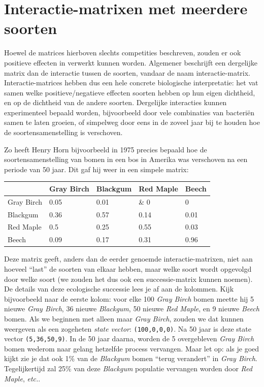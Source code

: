 \documentclass[
  a4paper,
]{scrbook}
\theoremstyle{definition}
\theoremstyle{remark}
\begin{document}
\hypertarget{interactie-matrixen-met-meerdere-soorten}{%
\section{Interactie-matrixen met meerdere
soorten}\label{interactie-matrixen-met-meerdere-soorten}}

Hoewel de matrices hierboven slechts competities beschreven, zouden er
ook positieve effecten in verwerkt kunnen worden. Algemener beschrijft
een dergelijke matrix dan de interactie tussen de soorten, vandaar de
naam interactie-matrix. Interactie-matrices hebben dus een hele concrete
biologische interpretatie: het vat samen welke positieve/negatieve
effecten soorten hebben op hun eigen dichtheid, en op de dichtheid van
de andere soorten. Dergelijke interacties kunnen experimenteel bepaald
worden, bijvoorbeeld door vele combinaties van bacteriën samen te laten
groeien, of simpelweg door eens in de zoveel jaar bij te houden hoe de
soortensamenstelling is verschoven.

Zo heeft Henry Horn bijvoorbeeld in 1975 precies bepaald hoe de
soortensamenstelling van bomen in een bos in Amerika was verschoven na
een periode van 50 jaar. Dit gaf hij weer in een simpele matrix:

\begin{longtable}[]{@{}lllll@{}}
\toprule\noalign{}
& Gray Birch & Blackgum & Red Maple & Beech \\
\midrule\noalign{}
\endhead
\bottomrule\noalign{}
\endlastfoot
Gray Birch & 0.05 & 0.01 & \& 0 & 0 \\
Blackgum & 0.36 & 0.57 & 0.14 & 0.01 \\
Red Maple & 0.5 & 0.25 & 0.55 & 0.03 \\
Beech & 0.09 & 0.17 & 0.31 & 0.96 \\
\end{longtable}

Deze matrix geeft, anders dan de eerder genoemde interactie-matrixen,
niet aan hoeveel ``last'' de soorten van elkaar hebben, maar welke soort
wordt opgevolgd door welke soort (we zouden het dus ook een
successie-matrix kunnen noemen). De details van deze ecologische
successie lees je af aan de kolommen. Kijk bijvoorbeeld naar de eerste
kolom: voor elke 100 \emph{Gray Birch} bomen meette hij 5 nieuwe
\emph{Gray Birch}, 36 nieuwe \emph{Blackgum}, 50 nieuwe \emph{Red
Maple}, en 9 nieuwe \emph{Beech} bomen. Als we beginnen met alleen maar
\emph{Gray Birch}, zouden we dat kunnen weergeven als een zogeheten
\emph{state vector}: \texttt{(100,0,0,0)}. Na 50 jaar is deze state
vector \texttt{(5,36,50,9)}. In de 50 jaar daarna, worden de 5
overgebleven \emph{Gray Birch} bomen wederom naar gelang hetzelfde
process vervangen. Maar let op: als je goed kijkt zie je dat ook 1\% van
de \emph{Blackgum} bomen ``terug verandert'' in \emph{Gray Birch}.
Tegelijkertijd zal 25\% van deze \emph{Blackgum} populatie vervangen
worden door \emph{Red Maple}, \emph{etc.}.
\end{document}
